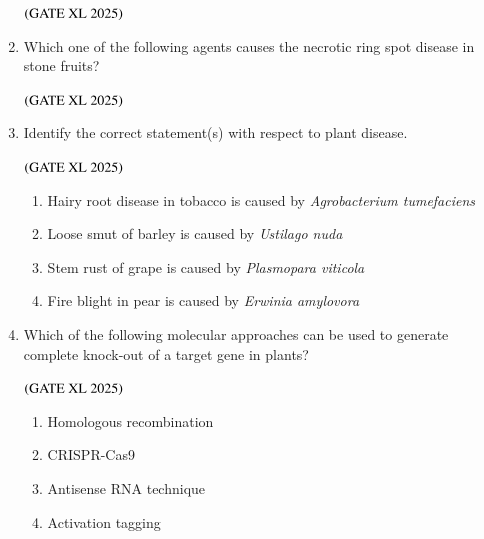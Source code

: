 \documentclass[journal]{IEEEtran}
\begin{document}
\begin{enumerate}
    \hfill $\left(\text{GATE XL 2025}\right)$
    \begin{enumerate}
    \end{enumerate}

    \item Which one of the following agents causes the necrotic ring spot disease in stone fruits?

    \hfill $\left(\text{GATE XL 2025}\right)$
    \begin{enumerate}
    \end{enumerate}

    \item Identify the correct statement(s) with respect to plant disease.

    \hfill $\left(\text{GATE XL 2025}\right)$
    \begin{enumerate}
        \item Hairy root disease in tobacco is caused by \textit{Agrobacterium tumefaciens}
        \item Loose smut of barley is caused by \textit{Ustilago nuda}
        \item Stem rust of grape is caused by \textit{Plasmopara viticola}
        \item Fire blight in pear is caused by \textit{Erwinia amylovora}
    \end{enumerate}

    \item Which of the following molecular approaches can be used to generate complete knock-out of a target gene in plants?

    \hfill $\left(\text{GATE XL 2025}\right)$
    \begin{enumerate}
        \item Homologous recombination
        \item CRISPR-Cas9
        \item Antisense RNA technique
        \item Activation tagging
    \end{enumerate}


\end{enumerate}
\end{document}
